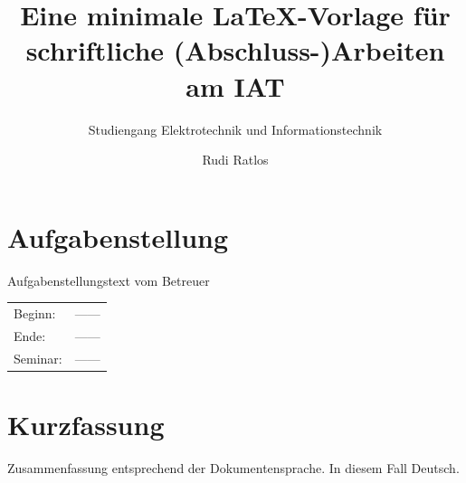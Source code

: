 \documentclass[
	ngerman,
	ruledheaders=section,%
	class=report,%
	thesis={type=Projektseminararbeit},%
	accentcolor=2c, %
	custommargins=false,
	marginpar=false,
	BCOR=10mm, %
	parskip=half-, %
	fontsize=11pt, %
  	twoside,
  	numbers=noendperiod,
  	fleqn,
  	captions=oneline, %
  	IMRAD=false,
]{tudapub}
\begin{document}

\title{Eine minimale \LaTeX-Vorlage für schriftliche (Abschluss-)Arbeiten am IAT}
\subtitle{\textmd{Studiengang Elektrotechnik und Informationstechnik}}
\author[R. Ratlos]{Rudi Ratlos}




\lowertitleback{
	Technische Universität Darmstadt\\
	Institut für Automatisierungstechnik und Mechatronik\\
	Fachgebiet Regelungstechnik und Mechatronik\\
	Prof. Dr.-Ing. Ulrich Konigorski\\
}

\frontmatter
\maketitle

\clearpage
\setcounter{page}{1}
\section*{Aufgabenstellung}

	Aufgabenstellungstext vom Betreuer
	
 \vspace{0.5cm}
\begin{tabular}{ll}
	Beginn: 	& ------ \\
	Ende: 		& ------ \\
	Seminar: 	& ------ \\
\end{tabular}
\clearpage

\affidavit
	
\section*{Kurzfassung}
	Zusammenfassung entsprechend der Dokumentensprache. In diesem Fall Deutsch.
\end{document}
